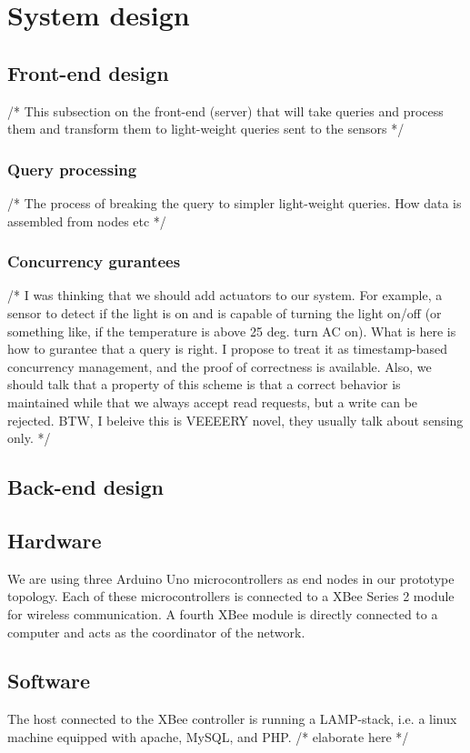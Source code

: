 \section{System design}\label{sec:design}

\subsection{Front-end design}
/* This subsection on the front-end (server) that will take queries and process them and transform them to light-weight queries sent to the sensors */

\subsubsection{Query processing}
/* The process of breaking the query to simpler light-weight queries. How data is assembled from nodes etc */

\subsubsection{Concurrency gurantees}
/* I was thinking that we should add actuators to our system. For example, a sensor to detect if the light is on and is capable of turning the light on/off (or something like, if the temperature is above 25 deg. turn AC on). What is here is how to gurantee that a query is right. I propose to treat it as timestamp-based concurrency management, and the proof of correctness is available. Also, we should talk that a property of this scheme is that a correct behavior is maintained while that we always accept read requests, but a write can be rejected.
BTW, I beleive this is VEEEERY novel, they usually talk about sensing only.
 */

\subsection{Back-end design}

\subsection{Hardware}
We are using three Arduino Uno microcontrollers as end nodes in our prototype topology. Each of these microcontrollers is connected to a XBee Series 2 module for wireless communication. A fourth XBee module is directly connected to a computer and acts as the coordinator of the network.

\subsection{Software}
The host connected to the XBee controller is running a LAMP-stack, i.e. a linux machine equipped with apache, MySQL, and PHP.
/* elaborate here */


